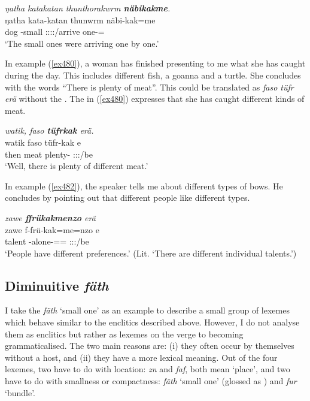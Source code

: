 \begin{exe}
	\ex \emph{ŋatha katakatan thunthorakwrm \textbf{näbikakme}.}\\
	\gll ŋatha kata-katan thunwrm näbi-kak=me\\
	dog \Redup-small \Stpl:\Sbj:\Pst:\Dur:\Venit/arrive one-\Distr=\Ins\\
	\trans `The small ones were arriving one by one.'
	\label{ex481}
\end{exe}

In example (\ref{ex480}), a woman has finished presenting to me what she has caught during the day. This includes different fish, a goanna and a turtle. She concludes with the words ``There is plenty of meat''. This could be translated as \emph{faso tüfr erä} without the . The  in (\ref{ex480}) expresses that she has caught different kinds of meat.

\begin{exe}
	\ex \emph{watik, faso \textbf{tüfrkak} erä.}\\
	\gll watik faso tüfr-kak e\\
	then meat plenty-\Distr{} \Stpl:\Sbj:\Nonpast:\Ipfv/be\\
	\trans `Well, there is plenty of different meat.'
	\label{ex480}
\end{exe}
	 
In example (\ref{ex482}), the speaker tells me about different types of bows. He concludes by pointing out that different people like different types.
	
\begin{exe}
	\ex \emph{zawe \textbf{ffrükakmenzo} erä}\\
	\gll zawe f-frü-kak=me=nzo e\\
	talent \Redup-alone-\Distr=\Ins=\Only{} \Stpl:\Sbj:\Nonpast:\Ipfv/be\\
	\trans `People have different preferences.' (Lit. `There are different individual talents.')
	\label{ex482}
\end{exe}

\subsection{Diminuitive \emph{fäth}}\label{diminuitivefaeth}

I take the  \emph{fäth} `small one' as an example to describe a small group of lexemes which behave similar to the enclitics described above. However, I do not analyse them as enclitics but rather as lexemes on the verge to becoming grammaticalised. The two main reasons are: (i) they often occur by themselves without a host, and (ii) they have a more lexical meaning. Out of the four lexemes, two have to do with location: \emph{zn} and \emph{faf}, both mean `place', and two have to do with smallness or compactness: \emph{fäth} `small one' (glossed as \Dim) and \emph{fur} `bundle'.%

